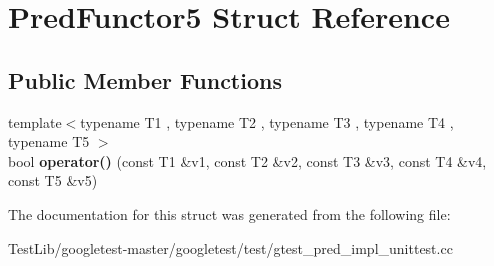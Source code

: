 \hypertarget{structPredFunctor5}{}\section{Pred\+Functor5 Struct Reference}
\label{structPredFunctor5}
\subsection*{Public Member Functions}
\begin{DoxyCompactItemize}
\item 
\mbox{\label{structPredFunctor5_af9decf4d509848479ccdc4fe90129a06}} 
{\footnotesize template$<$typename T1 , typename T2 , typename T3 , typename T4 , typename T5 $>$ }\\bool {\bfseries operator()} (const T1 \&v1, const T2 \&v2, const T3 \&v3, const T4 \&v4, const T5 \&v5)
\end{DoxyCompactItemize}


The documentation for this struct was generated from the following file\+:\begin{DoxyCompactItemize}
\item 
Test\+Lib/googletest-\/master/googletest/test/gtest\+\_\+pred\+\_\+impl\+\_\+unittest.\+cc\end{DoxyCompactItemize}
